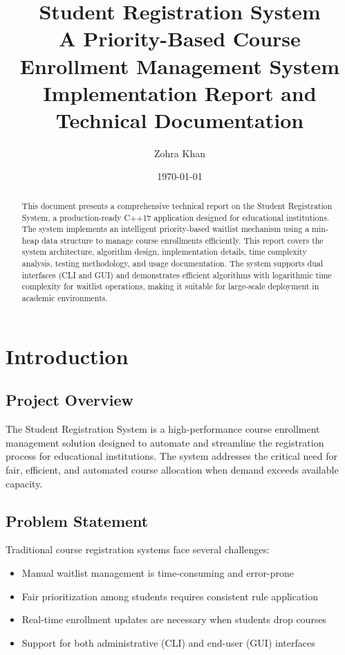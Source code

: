 \documentclass[12pt,a4paper]{article}
\title{\textbf{Student Registration System}\\
       \large{A Priority-Based Course Enrollment Management System}\\
       \large{Implementation Report and Technical Documentation}}
\author{Zohra Khan}
\date{\today}
\begin{document}
\maketitle

\begin{abstract}
This document presents a comprehensive technical report on the Student Registration System, a production-ready C++17 application designed for educational institutions. The system implements an intelligent priority-based waitlist mechanism using a min-heap data structure to manage course enrollments efficiently. This report covers the system architecture, algorithm design, implementation details, time complexity analysis, testing methodology, and usage documentation. The system supports dual interfaces (CLI and GUI) and demonstrates efficient algorithms with logarithmic time complexity for waitlist operations, making it suitable for large-scale deployment in academic environments.
\end{abstract}

\tableofcontents
\newpage

\section{Introduction}

\subsection{Project Overview}
The Student Registration System is a high-performance course enrollment management solution designed to automate and streamline the registration process for educational institutions. The system addresses the critical need for fair, efficient, and automated course allocation when demand exceeds available capacity.

\subsection{Problem Statement}
Traditional course registration systems face several challenges:
\begin{itemize}
    \item Manual waitlist management is time-consuming and error-prone
    \item Fair prioritization among students requires consistent rule application
    \item Real-time enrollment updates are necessary when students drop courses
    \item Support for both administrative (CLI) and end-user (GUI) interfaces
\end{itemize}
\end{document}
